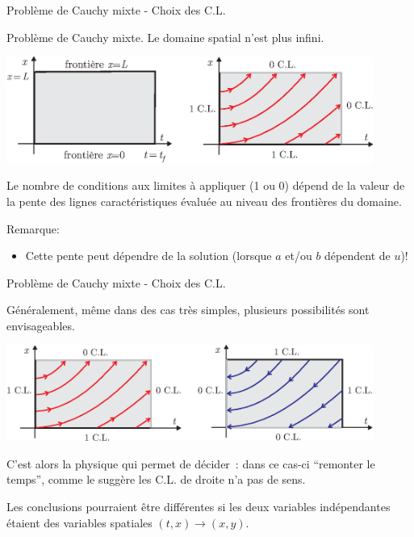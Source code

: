 \documentclass[
mode=present,    %
paper=a4paper,   %
orient=landscape,
display=slides,   %
size=10pt,
style=romain   %
]{powerdot}
\begin{document}
\begin{slide}[toc=Cauchy mixte / CL]{Problème de Cauchy mixte - Choix des C.L.}

Problème de Cauchy mixte. Le domaine spatial n'est plus infini.

\bigskip

    \centerline{\includegraphics[width=0.9\textwidth]{mixte1d.eps} }

Le nombre de conditions aux limites à appliquer (1 ou 0) dépend de la valeur de la pente des lignes caractéristiques évaluée au niveau des frontières du domaine.

\bigskip

Remarque:
\begin{itemize}
\item Cette pente peut dépendre de la solution (lorsque $a$ et/ou $b$ dépendent de $u$)!
\end{itemize}
\end{slide}


\begin{slide}[toc=]{Problème de Cauchy mixte - Choix des C.L.}

Généralement, même dans des cas très simples, plusieurs possibilités sont envisageables.

\bigskip

    \centerline{\includegraphics[width=0.9\textwidth]{clbis1d.eps} }

C'est alors la physique qui permet de décider~: dans ce cas-ci ``remonter le temps'', comme le suggère les C.L. de droite n'a pas de sens.

\bigskip

Les conclusions pourraient être différentes si les deux variables indépendantes étaient des variables spatiales $(t,x)\rightarrow(x,y)$.
\end{slide}
\end{document}
